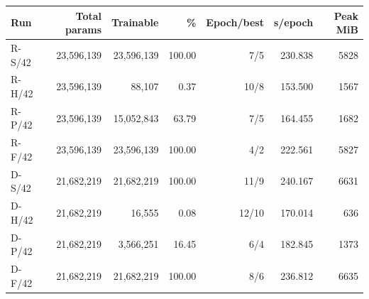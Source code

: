 \begin{tabular}{lrrrrrr}
\toprule
Run & Total params & Trainable & \% & Epoch/best & s/epoch & Peak MiB\\
\midrule
R-S/42 & 23,596,139 & 23,596,139 & 100.00 & 7/5 & 230.838 & 5828\\
R-H/42 & 23,596,139 & 88,107 & 0.37 & 10/8 & 153.500 & 1567\\
R-P/42 & 23,596,139 & 15,052,843 & 63.79 & 7/5 & 164.455 & 1682\\
R-F/42 & 23,596,139 & 23,596,139 & 100.00 & 4/2 & 222.561 & 5827\\
D-S/42 & 21,682,219 & 21,682,219 & 100.00 & 11/9 & 240.167 & 6631\\
D-H/42 & 21,682,219 & 16,555 & 0.08 & 12/10 & 170.014 & 636\\
D-P/42 & 21,682,219 & 3,566,251 & 16.45 & 6/4 & 182.845 & 1373\\
D-F/42 & 21,682,219 & 21,682,219 & 100.00 & 8/6 & 236.812 & 6635\\
\bottomrule
\end{tabular}
